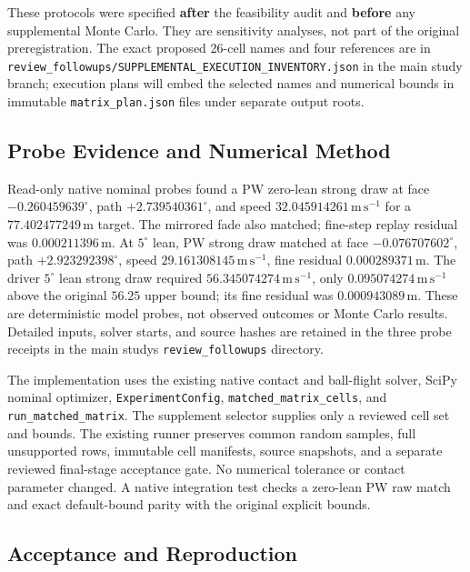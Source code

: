\documentclass[
]{article}
\begin{document}
These protocols were specified \textbf{after} the feasibility audit and
\textbf{before} any supplemental Monte Carlo. They are sensitivity
analyses, not part of the original preregistration. The exact proposed
26-cell names and four references are in
\texttt{review\_followups/SUPPLEMENTAL\_EXECUTION\_INVENTORY.json} in
the main study branch; execution plans will embed the selected names and
numerical bounds in immutable \texttt{matrix\_plan.json} files under
separate output roots.

\subsection{Probe Evidence and Numerical
Method}\label{probe-evidence-and-numerical-method}

Read-only native nominal probes found a PW zero-lean strong draw at face
\(-0.260459639^\circ\), path \(+2.739540361^\circ\), and speed
\(32.045914261\,\mathrm{m\,s^{-1}}\) for a \(77.402477249\,\mathrm{m}\)
target. The mirrored fade also matched; fine-step replay residual was
\(0.000211396\,\mathrm{m}\). At \(5^\circ\) lean, PW strong draw matched
at face \(-0.076707602^\circ\), path \(+2.923292398^\circ\), speed
\(29.161308145\,\mathrm{m\,s^{-1}}\), fine residual
\(0.000289371\,\mathrm{m}\). The driver \(5^\circ\) lean strong draw
required \(56.345074274\,\mathrm{m\,s^{-1}}\), only
\(0.095074274\,\mathrm{m\,s^{-1}}\) above the original \(56.25\) upper
bound; its fine residual was \(0.000943089\,\mathrm{m}\). These are
deterministic model probes, not observed outcomes or Monte Carlo
results. Detailed inputs, solver starts, and source hashes are retained
in the three probe receipts in the main study\textquotesingle s
\texttt{review\_followups} directory.

The implementation uses the existing native contact and ball-flight
solver, SciPy nominal optimizer, \texttt{ExperimentConfig},
\texttt{matched\_matrix\_cells}, and \texttt{run\_matched\_matrix}. The
supplement selector supplies only a reviewed cell set and bounds. The
existing runner preserves common random samples, full unsupported rows,
immutable cell manifests, source snapshots, and a separate reviewed
final-stage acceptance gate. No numerical tolerance or contact parameter
changed. A native integration test checks a zero-lean PW raw match and
exact default-bound parity with the original explicit bounds.

\subsection{Acceptance and
Reproduction}\label{acceptance-and-reproduction}
\end{document}
